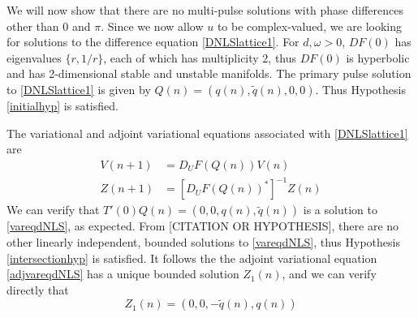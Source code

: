 \documentclass[12pt]{article}
\begin{document}
We will now show that there are no multi-pulse solutions with phase differences other than $0$ and $\pi$. Since we now allow $u$ to be complex-valued, we are looking for solutions to the difference equation \eqref{DNLSlattice1}. For $d, \omega > 0$, $DF(0)$ has eigenvalues $\{r, 1/r\}$, each of which has multiplicity 2, thus $DF(0)$ is hyperbolic and has 2-dimensional stable and unstable manifolds. The primary pulse solution to \eqref{DNLSlattice1} is given by $Q(n) = (q(n), \tilde{q}(n), 0, 0)$. Thus Hypothesis \ref{initialhyp} is satisfied. 

The variational and adjoint variational equations associated with \eqref{DNLSlattice1} are
\begin{align}
V(n+1) &= D_U F(Q(n)) V(n) \label{vareqdNLS} \\
Z(n+1) &= [D_U F(Q(n))^*]^{-1} Z(n) \label{adjvareqdNLS}
\end{align}
We can verify that $T'(0) Q(n) = (0, 0, q(n), \tilde{q}(n))$ is a solution to \eqref{vareqdNLS}, as expected. From [CITATION OR HYPOTHESIS], there are no other linearly independent, bounded solutions to \eqref{vareqdNLS}, thus Hypothesis \ref{intersectionhyp} is satisfied. It follows the the adjoint variational equation \eqref{adjvareqdNLS} has a unique bounded solution $Z_1(n)$, and we can verify directly that
\begin{equation}\label{defZ1}
Z_1(n) = (0, 0, -\tilde{q}(n), q(n))
\end{equation}
\end{document}
